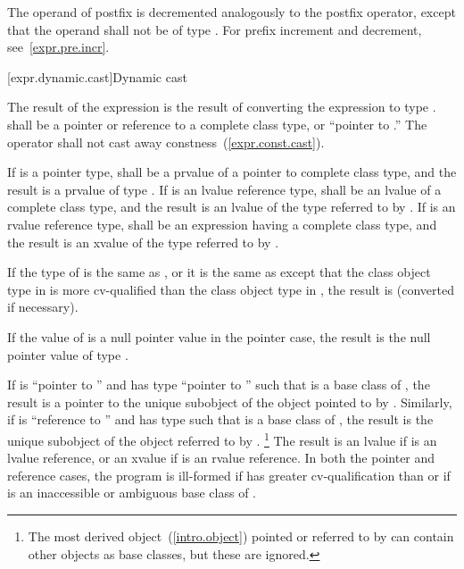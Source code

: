 \pnum
{}%
%
%
%
The operand of postfix \tcode{\dcr} is decremented analogously to the
postfix \tcode{++} operator, except that the operand shall not be of
type .
\enternote 
For prefix increment and decrement, see~\ref{expr.pre.incr}.
\exitnote 

[expr.dynamic.cast]{Dynamic cast}

\pnum
{}%
%
The result of the expression  is the result of
converting the expression  to type .
%
 shall be a pointer or reference to a complete class type, or
``pointer to  .'' The  operator shall not cast
away constness~(\ref{expr.const.cast}).

\pnum
If  is a pointer type,  shall be a prvalue of a
pointer to complete class type, and the result is a prvalue of type
. If  is an lvalue reference type,  shall be
an lvalue of a complete class type, and the result is an lvalue of the
type referred to by . If  is an rvalue reference type,
 shall be an expression having a complete class type, and the
result is an xvalue of the type referred to by .

\pnum
If the type of  is the same as , or it is
the same as  except that the class object type in  is
more cv-qualified than the class object type in , the result is
 (converted if necessary).

\pnum
If the value of  is a null pointer value in the pointer case,
the result is the null pointer value of type .

\pnum
If  is ``pointer to  '' and  has
type ``pointer to  '' such that  is a base
class of , the result is a pointer to the unique 
subobject of the  object pointed to by . Similarly, if
 is ``reference to  '' and  has
type   such that  is a base class of
, the result is the unique  subobject of the 
object referred to by .
\footnote{The most derived object~(\ref{intro.object}) pointed or referred to by
 can contain other  objects as base classes, but these
are ignored.}
The result is an lvalue if  is an lvalue reference, or an
xvalue if  is an rvalue reference. In both the pointer and
reference cases, the program is ill-formed if  has greater
cv-qualification than  or if  is an inaccessible or
ambiguous base class of .
\enterexample 

